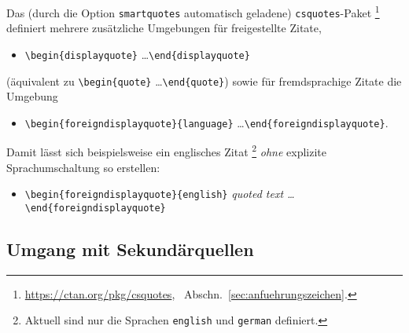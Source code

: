 Das (durch die Option \texttt{smartquotes} automatisch geladene) \texttt{csquotes}-Paket%
\footnote{\url{https://ctan.org/pkg/csquotes}, \sa\ Abschn.\ \ref{sec:anfuehrungszeichen}.}
definiert mehrere zusätzliche Umgebungen für freigestellte Zitate, \zB\
\begin{itemize}
 \item[] \verb!\begin{displayquote}! \ldots \verb!\end{displayquote}!
\end{itemize}
(äquivalent zu \verb!\begin{quote}! \ldots \verb!\end{quote}!) sowie für fremdsprachige Zitate die Umgebung
\begin{itemize}
 \item[] \verb!\begin{foreigndisplayquote}{language}! \ldots \verb!\end{foreigndisplayquote}!.
\end{itemize}
Damit lässt sich beispielsweise ein englisches Zitat%
\footnote{Aktuell sind nur die Sprachen \texttt{english} und \texttt{german} definiert.}
\emph{ohne} explizite Sprachumschaltung
so erstellen:
\begin{itemize}
 \item[] \verb!\begin{foreigndisplayquote}{english}!\newline
	\emph{quoted text \ldots}\newline
	\verb!\end{foreigndisplayquote}!
\end{itemize}


\subsection{Umgang mit Sekundärquellen}

